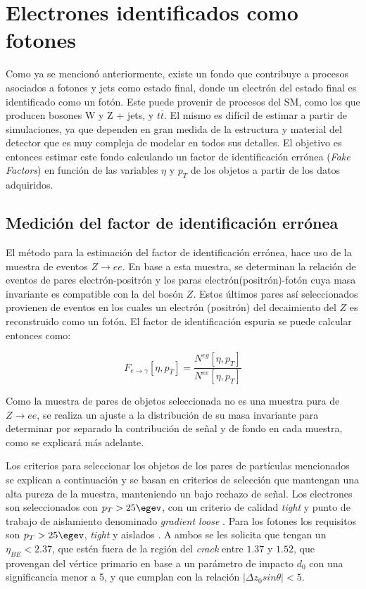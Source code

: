 \chapter{Electrones identificados como fotones}\label{ch:e_fake}


Como ya se mencionó anteriormente, existe un fondo que contribuye a procesos asociados a fotones y jets como estado final, donde un electrón del estado final es identificado como un fotón. Este puede provenir de procesos del SM, como los que producen bosones W y Z + jets, y $t \overline{t}$. El mismo es difícil de estimar a partir de simulaciones, ya que dependen en gran medida de la estructura y material del detector que es muy compleja de modelar en todos sus detalles. El objetivo es entonces estimar este fondo calculando un factor de identificación errónea (\textit{Fake Factors}) en función de las variables $\eta$ y $p_{T}$ de los objetos a partir de los datos adquiridos.

\section{Medición del factor de identificación errónea}

El método para la estimación del factor de identificación errónea, hace uso de la muestra de eventos $Z\rightarrow ee$. En base a esta muestra, se determinan la relación de eventos de pares electrón-positrón y los paras electrón(positrón)-fotón cuya masa invariante es compatible con la del bosón $Z$. Estos últimos pares así seleccionados provienen de eventos en los cuales un electrón (positrón) del decaimiento del $Z$ es reconstruido como un fotón. El factor de identificación espuria se puede calcular entonces como: 

\begin{equation}
F_{e\rightarrow\gamma}[\eta , p_{T}]=\frac{N^{eg}[\eta , p_{T}]}{N^{ee}[\eta , p_{T}]} \label{eq:ff_ratio}
\end{equation}

Como la muestra de pares de objetos seleccionada no es una muestra pura de $Z\rightarrow ee$, se realiza un ajuste a la distribución de su masa invariante para determinar por separado la contribución de señal y de fondo en cada muestra, como se explicará más adelante.

Los criterios para seleccionar los objetos de los pares de partículas mencionados se explican a continuación y se basan en criterios de selección que mantengan una alta pureza de la muestra, manteniendo un bajo rechazo de señal.
Los electrones  son seleccionados con $p_{T} > 25 \egev$, con un criterio de calidad \textit{tight} y punto de trabajo de aislamiento denominado \textit{gradient loose} \cite{ATLAS-CONF-2016-024}. Para los fotones los requisitos son $p_{T} > 25 \egev$, \textit{tight} y aislados \cite{STDM-2010-08}. A ambos se les solicita que tengan un $\eta_{BE}<2.37$, que estén fuera de la región del \textit{crack} entre $1.37$ y $1.52$, que provengan del vértice primario en base a un parámetro de impacto $d_{0}$ con una significancia menor a 5, y que cumplan con la relación $|\Delta z_{0}sin\theta|<5$.


